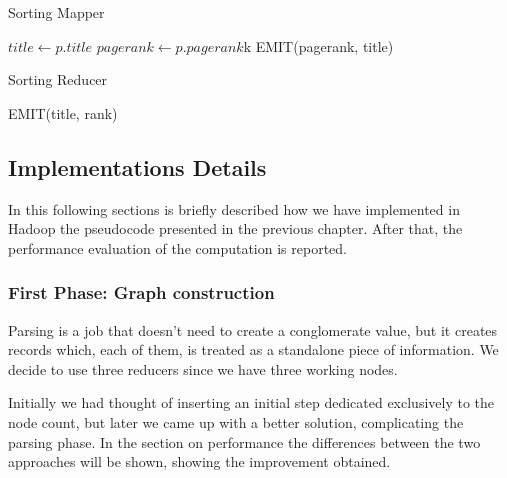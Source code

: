 \begin{algorithm}[H]
	\caption{Sorting Mapper}\label{Mapper}
	\begin{algorithmic}[1]
		\State $title \gets p.title$
		\State $pagerank \gets p.pagerank$k
		\State EMIT(pagerank, title)
		\EndProcedure
	\end{algorithmic}
\end{algorithm}

\begin{algorithm}[H]
	\caption{Sorting Reducer}\label{Reducer}
	\begin{algorithmic}[1]
		\State EMIT(title, rank)
		\EndFor
		\EndProcedure
	\end{algorithmic}
\end{algorithm}

\subsection{Implementations Details}
In this following sections is briefly described how we have implemented in Hadoop the pseudocode presented in the previous chapter. After that, the performance evaluation of the computation is reported.

\subsubsection{First Phase: Graph construction}
Parsing is a job that doesn't need to create a conglomerate value, but it creates records which, each of them, is treated as a standalone piece of information. We decide to use three reducers since we have three working nodes.

\noindent Initially we had thought of inserting an initial step dedicated exclusively to the node count, but later we came up with a better solution, complicating the parsing phase. In the section on performance the differences between the two approaches will be shown, showing the improvement obtained.


